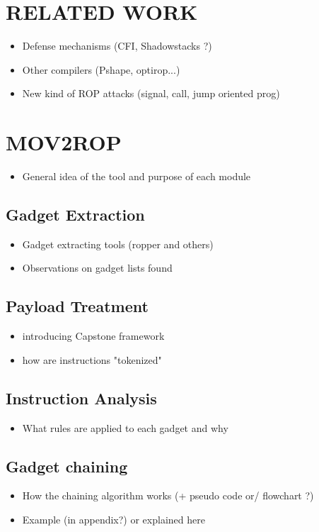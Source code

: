 \documentclass[10pt,twocolumn]{article}
\begin{document}
\section{RELATED WORK}
\begin{itemize}
    \item Defense mechanisms (CFI, Shadowstacks ?)
    \item Other compilers (Pshape, optirop...)
    \item New kind of ROP attacks (signal, call, jump oriented prog)
\end{itemize}

\section{MOV2ROP}
\begin{itemize}
    \item General idea of the tool and purpose of each module
\end{itemize}

\subsection{Gadget Extraction}
\begin{itemize}
    \item Gadget extracting tools (ropper and others)
    \item Observations on gadget lists found
\end{itemize}

\subsection{Payload Treatment}
\begin{itemize}
    \item introducing Capstone framework
    \item how are instructions "tokenized"
\end{itemize}
\subsection{Instruction Analysis}
\begin{itemize}
    \item What rules are applied to each gadget and why
\end{itemize}
\subsection{Gadget chaining}
\begin{itemize}
    \item How the chaining algorithm works (+ pseudo code or/ flowchart ?)
    \item Example (in appendix?) or explained here
\end{itemize}
\end{document}
